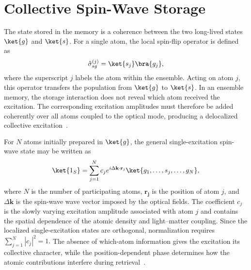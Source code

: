\section{Collective Spin-Wave Storage}
\label{sec:collective_spin_wave_storage}

The state stored in the memory is a coherence between the two long-lived states $\ket{g}$ and $\ket{s}$. For a single atom, the local spin-flip operator is defined as~\cite{PsiL-odamIFm_GorshkovEtAl_2007}
\begin{equation}
\hat{\sigma}_{sg}^{(j)}
=
\ket{s_j}\bra{g_j},
\label{eq:single_atom_spin_flip}
\end{equation}
where the superscript $j$ labels the atom within the ensemble. Acting on atom $j$, this operator transfers the population from $\ket{g}$ to $\ket{s}$. In an ensemble memory, the storage interaction does not reveal which atom received the excitation. The corresponding excitation amplitudes must therefore be added coherently over all atoms coupled to the optical mode, producing a delocalized collective excitation~\cite{PsiL-odamIFm_GorshkovEtAl_2007,Lqcwaealo_DuanEtAl_2001}.

For $N$ atoms initially prepared in $\ket{g}$, the general single-excitation spin-wave state may be written as~\cite{PsiL-odamIFm_GorshkovEtAl_2007,Lqcwaealo_DuanEtAl_2001}
\begin{equation}
\ket{1_S}
=
\sum_{j=1}^{N}
c_j
e^{i\Delta\mathbf{k}\cdot\mathbf{r}_j}
\ket{g_1,\ldots,s_j,\ldots,g_N},
\label{eq:single_spin_wave_state}
\end{equation}
where $N$ is the number of participating atoms, $\mathbf{r_j}$ is the position of atom $j$, and $\Delta\mathbf{k}$ is the spin-wave wave vector imposed by the optical fields. The coefficient $c_j$ is the slowly varying excitation amplitude associated with atom $j$ and contains the spatial dependence of the atomic density and light--matter coupling. Since the localized single-excitation states are orthogonal, normalization requires
$\sum_{j=1}^{N}
\left|c_j\right|^2
=
1.$ The absence of which-atom information gives the excitation its collective character, while the position-dependent phase determines how the atomic contributions interfere during retrieval~\cite{PsiL-odamIFm_GorshkovEtAl_2007,Lqcwaealo_DuanEtAl_2001}.

